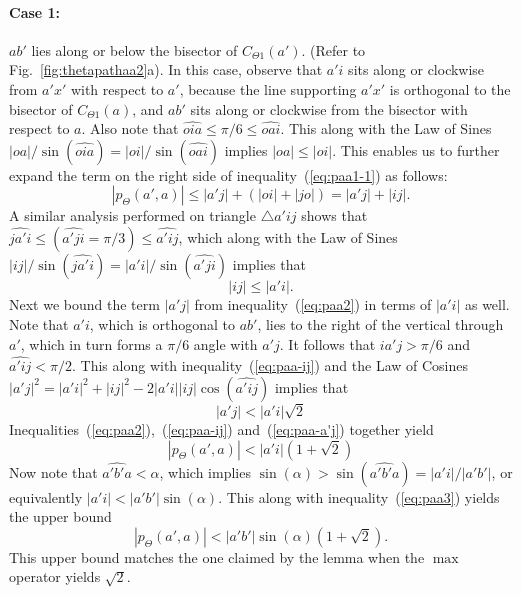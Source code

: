 \documentclass[11pt]{article}
\newcommand\cone{{C}}
\newcommand\ang[1]{\widehat{#1}}
\begin{document}
\paragraph{Case 1:} $ab'$ lies along or below the bisector of $\cone_{\Theta1}(a')$. (Refer to Fig.~\ref{fig:thetapathaa2}a). In this case, observe that
$a'i$ sits along or clockwise from $a'x'$ with respect to $a'$, because the line supporting $a'x'$ is orthogonal to the bisector of $C_{\Theta1}(a)$, and $ab'$ sits along or clockwise from the bisector with respect to $a$. Also note that $\ang{oia} \le \pi/6 \le \ang{oai}$. This along with the Law of Sines $|oa|/\sin(\ang{oia}) = |oi|/\sin(\ang{oai})$ implies $|oa| \le |oi|$. This enables us to further expand the term on the right side of inequality~(\ref{eq:paa1-1}) as follows:
\begin{equation}
|p_\Theta(a',a)| \le |a'j| + (|oi| + |jo|) = |a'j| + |ij|.
\label{eq:paa2}
\end{equation}
A similar analysis performed on triangle $\triangle a'ij$ shows that $\ang{ja'i} \le (\ang{a'ji} = \pi/3) \le \ang{a'ij}$, which along with the Law of Sines $|ij|/\sin(\ang{ja'i}) = |a'i|/\sin(\ang{a'ji})$ implies that
\begin{equation}
|ij| \le |a'i|.
\label{eq:paa-ij}
\end{equation}
Next we bound the term $|a'j|$ from inequality~(\ref{eq:paa2}) in terms of $|a'i|$ as well. Note that $a'i$, which is orthogonal to $ab'$, lies to the right of the vertical through $a'$, which in turn forms a $\pi/6$ angle with $a'j$. It follows that $\ang{ia'j} > \pi/6$ and $\ang{a'ij} < \pi/2$. This along with inequality~(\ref{eq:paa-ij}) and the Law of Cosines $|a'j|^2 = |a'i|^2 + |ij|^2 - 2|a'i||ij|\cos(\ang{a'ij})$
implies that
\begin{equation}
|a'j| < |a'i|\sqrt{2}
\label{eq:paa-a'j}
\end{equation}
Inequalities~(\ref{eq:paa2}),~(\ref{eq:paa-ij}) and~(\ref{eq:paa-a'j}) together yield
\begin{equation}
|p_\Theta(a',a)| < |a'i|(1+\sqrt{2})
\label{eq:paa3}
\end{equation}
Now note that $\ang{a'b'a} < \alpha$, which implies $\sin(\alpha) > \sin(\ang{a'b'a}) = |a'i| / |a'b'|$, or equivalently $|a'i| < |a'b'|\sin(\alpha)$. This along with inequality~(\ref{eq:paa3}) yields the upper bound
\begin{equation}
|p_\Theta(a',a)| < |a'b'|\sin(\alpha)(1+\sqrt{2}).
\label{eq:ub1}
\end{equation}
This upper bound matches the one claimed by the lemma when the $\max$ operator yields $\sqrt{2}$.
\end{document}
